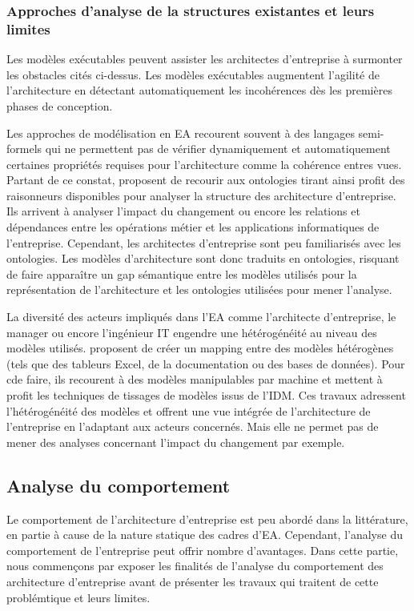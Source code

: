 \subsubsection{Approches d'analyse de la structures existantes et leurs limites}
	
Les modèles exécutables peuvent assister les architectes d'entreprise à
surmonter les obstacles cités ci-dessus. Les modèles exécutables augmentent
l'agilité de l'architecture en détectant automatiquement les incohérences dès
les premières phases de conception. 
	
Les approches de modélisation en EA recourent souvent à des langages
semi-formels qui ne permettent pas de vérifier dynamiquement et automatiquement
certaines propriétés requises pour l'architecture comme la cohérence entres
vues. Partant de ce constat, \cite{sunkle_analyzing_2013} proposent de recourir
aux ontologies tirant ainsi profit des raisonneurs disponibles pour analyser la
structure des architecture d'entreprise. Ils arrivent à analyser l'impact du
changement ou encore les relations et dépendances entre les opérations métier
et les applications informatiques de l'entreprise. Cependant, les architectes
d'entreprise sont peu familiarisés avec les ontologies. Les modèles
d'architecture sont donc traduits en ontologies, risquant de faire
apparaître un gap sémantique entre les modèles utilisés pour la représentation
de l'architecture et les ontologies utilisées pour mener l'analyse.
	
La diversité des acteurs impliqués dans l'EA comme l'architecte d'entreprise,
le manager ou encore l'ingénieur IT engendre une hétérogénéité au niveau des
modèles utilisés. \cite{bruneliere2013support} proposent de créer un mapping
entre des modèles hétérogènes (tels que des tableurs Excel, de la documentation
ou des bases de données). Pour cde faire, ils recourent à des modèles manipulables par machine et mettent à profit les techniques de tissages de modèles issus de l'IDM. Ces
travaux adressent l'hétérogénéité des modèles et offrent une vue intégrée
de l'architecture de l'entreprise en l'adaptant aux acteurs concernés. Mais elle ne permet pas de mener des analyses concernant l'impact du changement par exemple. 

	
\subsection{Analyse du comportement}

Le comportement de l'architecture d'entreprise est peu abordé dans la littérature,
en partie à cause de la nature statique des cadres d'EA. Cependant, l'analyse du
comportement de l'entreprise peut offrir nombre d'avantages. Dans cette partie, nous
commençons par exposer les finalités de l'analyse du comportement des
architecture d'entreprise avant de présenter les travaux qui traitent de cette problémtique
et leurs limites.


